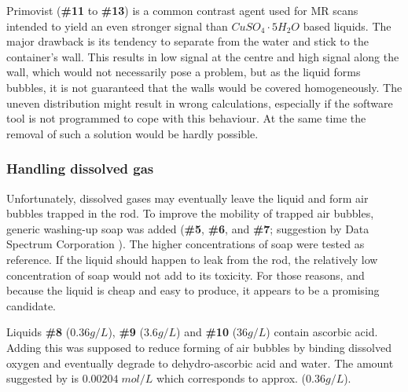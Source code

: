 \vspace{1cm}

Primovist (\textbf{\#11} to \textbf{\#13}) is a common contrast agent used for MR scans \cite{VanBeers2012, Rohrer, primovist} intended to yield an even stronger signal than $CuSO_4\cdot5H_2O$ based liquids.
The major drawback is its tendency to separate from the water and stick to the container's wall.
This results in low signal at the centre and high signal along the wall, which would not necessarily pose a problem, but as the liquid forms bubbles, it is not guaranteed that the walls would be covered homogeneously.
The uneven distribution might result in wrong calculations, especially if the software tool is not programmed to cope with this behaviour.
At the same time the removal of such a solution would be hardly possible.

\subsubsection{Handling dissolved gas}
Unfortunately, dissolved gases may eventually leave the liquid and form air bubbles trapped in the rod.
To improve the mobility of trapped air bubbles, generic washing-up soap was added (\textbf{\#5}, \textbf{\#6}, and \textbf{\#7}; suggestion by Data Spectrum Corporation \cite{bubbles}).
The higher concentrations of soap were tested as reference.
If the liquid should happen to leak from the rod, the relatively low concentration of soap would not add to its toxicity.
For those reasons, and because the liquid is cheap and easy to produce, it appears to be a promising candidate.

\vspace{1cm}

Liquids \textbf{\#8} ($0.36 g/L$), \textbf{\#9} ($3.6 g/L$) and \textbf{\#10} ($36 g/L$) contain ascorbic acid.
Adding this was supposed to reduce forming of air bubbles by binding dissolved oxygen and eventually degrade to dehydro-ascorbic acid and water.
The amount suggested by \cite{Abtahi2008, Bodannes1979} is $0.00204 \; mol/L$ which corresponds to approx. ($0.36 g/L$).

\vspace{1cm}

